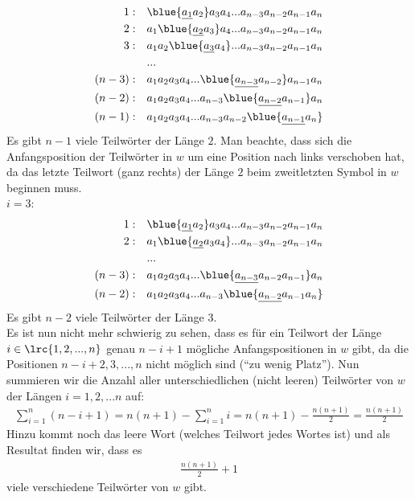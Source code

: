 \begin{myanswer}
\begin{aenum}
\begin{align*}
			1: \quad    & \blue{\underline{a_1}a_2}a_3a_4...a_{n-3}a_{n-2}a_{n-1}a_n \\
			2: \quad    & a_1\blue{\underline{a_2}a_3}a_4...a_{n-3}a_{n-2}a_{n-1}a_n \\
			3: \quad    & a_1a_2\blue{\underline{a_3}a_4}...a_{n-3}a_{n-2}a_{n-1}a_n \\
			            & ...                                                        \\
			(n-3):\quad & a_1a_2a_3a_4...\blue{\underline{a_{n-3}}a_{n-2}}a_{n-1}a_n \\
			(n-2):\quad & a_1a_2a_3a_4...a_{n-3}\blue{\underline{a_{n-2}}a_{n-1}}a_n \\
			(n-1):\quad & a_1a_2a_3a_4...a_{n-3}a_{n-2}\blue{\underline{a_{n-1}}a_n}
		\end{align*}
		Es gibt $n-1$ viele Teilwörter der Länge $2$. Man beachte, dass sich die Anfangsposition der Teilwörter in $w$ um eine Position nach links verschoben hat, da das letzte Teilwort (ganz rechts) der Länge $2$ beim zweitletzten Symbol in $w$ beginnen muss.\\
		\underline{$i = 3$}:
		\begin{align*}
			1: \quad    & \blue{\underline{a_1}a_2}a_3a_4...a_{n-3}a_{n-2}a_{n-1}a_n \\
			2: \quad    & a_1\blue{\underline{a_2}a_3a_4}...a_{n-3}a_{n-2}a_{n-1}a_n \\
			            & ...                                                        \\
			(n-3):\quad & a_1a_2a_3a_4...\blue{\underline{a_{n-3}}a_{n-2}a_{n-1}}a_n \\
			(n-2):\quad & a_1a_2a_3a_4...a_{n-3}\blue{\underline{a_{n-2}}a_{n-1}a_n}
		\end{align*}
		Es gibt $n-2$ viele Teilwörter der Länge $3$.\\

		\noindent
		Es ist nun nicht mehr schwierig zu sehen, dass es für ein Teilwort der Länge $i\in\lrc{1,2,...,n}$ genau $n-i+1$ mögliche Anfangspositionen in $w$ gibt, da die Positionen $n-i+2,3,...,n$ nicht möglich sind (\enquote{zu wenig Platz}). Nun summieren wir die Anzahl aller unterschiedlichen (nicht leeren) Teilwörter von $w$ der Längen $i=1,2,...n$ auf:
		\begin{align*}
			\sum_{i=1}^n (n-i+1) = n(n+1)-\sum_{i=1}^n i = n(n+1) - \frac{n(n+1)}{2}=\frac{n(n+1)}{2}
		\end{align*}
		Hinzu kommt noch das leere Wort (welches Teilwort jedes Wortes ist) und als Resultat finden wir, dass es
		\begin{align*}
			\frac{n(n+1)}{2} + 1
		\end{align*}
		viele verschiedene Teilwörter von $w$ gibt.
	\end{aenum}
\end{myanswer}


